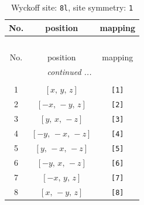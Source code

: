 \documentclass[fleqn,8pt]{jsarticle}
\begin{document}
\renewcommand{\arraystretch}{1.2}
\begin{longtable}{ccc}
\caption{Wyckoff site: {\tt 8l}, site symmetry: {\tt 1}}
 \\
 \hline \hline
No. & position & mapping \\ \hline \endfirsthead

\multicolumn{2}{l}{\tablename\ \thetable{}} \\
 \hline \hline
No. & position & mapping \\ \hline \endhead

 \hline \hline
\multicolumn{2}{r}{\footnotesize\it continued ...} \\ \endfoot

 \hline \hline
\multicolumn{2}{r}{} \\ \endlastfoot

1 & $\left[ x,\, y,\, z \right]$ & {\tt [1]} \\ \hline
2 & $\left[ - x,\, - y,\, z \right]$ & {\tt [2]} \\ \hline
3 & $\left[ y,\, x,\, - z \right]$ & {\tt [3]} \\ \hline
4 & $\left[ - y,\, - x,\, - z \right]$ & {\tt [4]} \\ \hline
5 & $\left[ y,\, - x,\, - z \right]$ & {\tt [5]} \\ \hline
6 & $\left[ - y,\, x,\, - z \right]$ & {\tt [6]} \\ \hline
7 & $\left[ - x,\, y,\, z \right]$ & {\tt [7]} \\ \hline
8 & $\left[ x,\, - y,\, z \right]$ & {\tt [8]} \\
\end{longtable}
\end{document}
